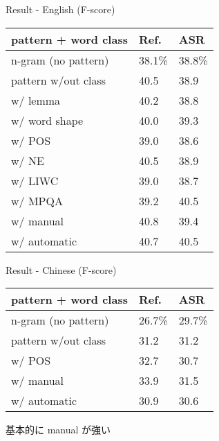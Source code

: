 \documentclass[12pt, dvipdfmx, default, cjk]{beamer}
\begin{document}
\begin{frame}{Result - English (F-score)}
  \begin{table}[h]
    \begin{tabular}{l|l|l} \hline
       pattern + word class & Ref.   & ASR \\ \hline
       n-gram (no pattern)  & 38.1\% & 38.8\% \\
       pattern w/out class  & 40.5   & 38.9 \\
       w/ lemma      & 40.2 & 38.8 \\
       w/ word shape & 40.0 & 39.3 \\
       w/ POS        & 39.0 & 38.6 \\
       w/ NE         & 40.5 & 38.9 \\
       w/ LIWC       & 39.0 & 38.7 \\
       w/ MPQA       & 39.2 & \alert{40.5} \\
       w/ manual     & \alert{40.8} & 39.4 \\
       w/ automatic  & 40.7 & \alert{40.5} \\ \hline
    \end{tabular}
  \end{table}
\end{frame}

\begin{frame}{Result - Chinese (F-score)}
  \begin{table}[h]
    \begin{tabular}{l|l|l} \hline
       pattern + word class & Ref.   & ASR \\ \hline
       n-gram (no pattern)  & 26.7\% & 29.7\% \\
       pattern w/out class  & 31.2   & 31.2 \\
       w/ POS       & 32.7         & 30.7 \\
       w/ manual    & \alert{33.9} & \alert{31.5} \\
       w/ automatic & 30.9         & 30.6 \\ \hline
     \end{tabular}
   \end{table}

   基本的に manual が強い
\end{frame}
\end{document}
